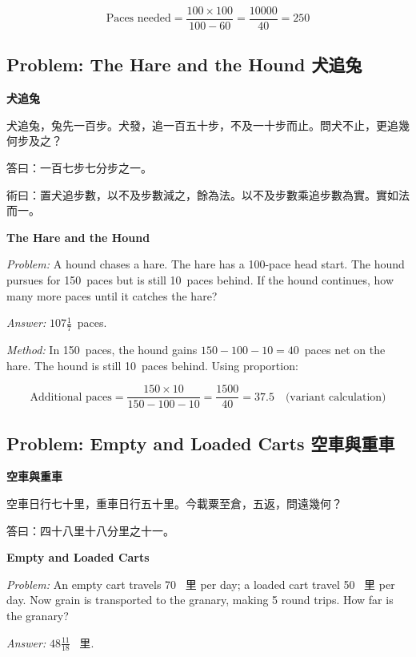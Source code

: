 \documentclass[11pt,a4paper]{article}
\newcommand{\zh}[1]{{\CJKfamily{\CJKrmdefault} #1}}
\newenvironment{chside}{%
  \begin{minipage}[t]{0.48\textwidth}%
  \setlength{\parindent}{1.5em}%
  \linespread{1.25}\selectfont%
  \small%
}{%
  \end{minipage}%
}
\newenvironment{enside}{%
  \hfill\begin{minipage}[t]{0.48\textwidth}%
  \setlength{\parindent}{1em}%
  \linespread{1.15}\selectfont%
  \small%
}{%
  \end{minipage}%
}
\begin{document}
\begin{equation*}
\text{Paces needed} = \frac{100 \times 100}{100 - 60} = \frac{10000}{40} = 250
\end{equation*}

\subsection{Problem: The Hare and the Hound \zh{犬追兔}}

\noindent\begin{chside}
\noindent\textbf{犬追兔}

\zh{犬追兔，兔先一百步。犬發，追一百五十步，不及一十步而止。問犬不止，更追幾何步及之？}

\medskip
\zh{答曰：一百七步七分步之一。}

\medskip
\zh{術曰：置犬追步數，以不及步數減之，餘為法。以不及步數乘追步數為實。實如法而一。}
\end{chside}%
\begin{enside}
\noindent\textbf{The Hare and the Hound}

\textit{Problem:} A hound chases a hare. The hare has a 100-pace head start.
The hound pursues for 150~paces but is still 10~paces behind. If the hound
continues, how many more paces until it catches the hare?

\medskip
\textit{Answer:} $107\frac{1}{7}$~paces.

\medskip
\textit{Method:} In 150~paces, the hound gains $150 - 100 - 10 = 40$~paces
net on the hare. The hound is still 10~paces behind. Using proportion:
\end{enside}

\begin{equation*}
\text{Additional paces} = \frac{150 \times 10}{150 - 100 - 10} = \frac{1500}{40} = 37.5 \quad \text{(variant calculation)}
\end{equation*}

\subsection{Problem: Empty and Loaded Carts \zh{空車與重車}}

\noindent\begin{chside}
\noindent\textbf{空車與重車}

\zh{空車日行七十里，重車日行五十里。今載粟至倉，五返，問遠幾何？}

\medskip
\zh{答曰：四十八里十八分里之十一。}
\end{chside}%
\begin{enside}
\noindent\textbf{Empty and Loaded Carts}

\textit{Problem:} An empty cart travels 70~\zh{里} per day; a loaded cart
travel 50~\zh{里} per day. Now grain is transported to the granary, making 5
round trips. How far is the granary?

\medskip
\textit{Answer:} $48\frac{11}{18}$~\zh{里}.
\end{enside}
\end{document}
